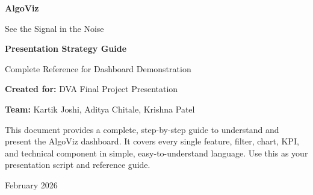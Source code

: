 \documentclass[12pt,a4paper]{article}
\begin{document}
\begin{titlepage}
    \centering
    \vspace*{2cm}
    
    {\Huge\bfseries\textcolor{algovizpurple}{AlgoViz}\par}
    \vspace{0.5cm}
    {\Large\textcolor{lighttext}{See the Signal in the Noise}\par}
    
    \vspace{2cm}
    
    {\LARGE\bfseries Presentation Strategy Guide\par}
    \vspace{0.5cm}
    {\large Complete Reference for Dashboard Demonstration\par}
    
    \vspace{3cm}
    
    {\large\textbf{Created for:} DVA Final Project Presentation\par}
    \vspace{0.3cm}
    {\large\textbf{Team:} Kartik Joshi, Aditya Chitale, Krishna Patel\par}
    
    \vspace{2cm}
    
    \begin{importantbox}
    This document provides a complete, step-by-step guide to understand and present the AlgoViz dashboard. It covers every single feature, filter, chart, KPI, and technical component in simple, easy-to-understand language. Use this as your presentation script and reference guide.
    \end{importantbox}
    
    \vfill
    {\small February 2026\par}
\end{titlepage}

\tableofcontents
\newpage

\end{document}

